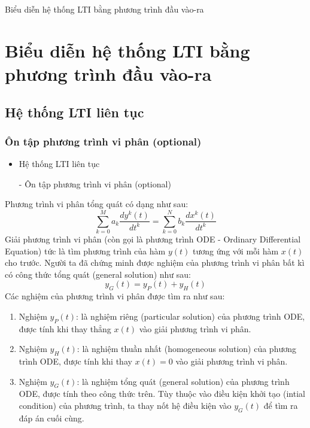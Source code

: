 \documentclass[8pt]{beamer}
\begin{document}
\begin{frame}{Biểu diễn hệ thống LTI bằng phương trình đầu vào-ra}
\section{Biểu diễn hệ thống LTI bằng phương trình đầu vào-ra}
\subsection{Hệ thống LTI liên tục}
\subsubsection{Ôn tập phương trình vi phân (optional)}
\begin{itemize}
	\item Hệ thống LTI liên tục
	\end{itemize}
\begin{itemize}
\item[-] Ôn tập phương trình vi phân (optional)
\end{itemize}
Phương trình vi phân tổng quát có dạng như sau:
$$\sum_{k=0}^{M}a_{k}\frac{dy^k(t)}{dt^k}=\sum_{k=0}^{N}b_{k}\frac{dx^k(t)}{dt^k}$$
Giải phương trình vi phân (còn gọi là phương trình ODE - Ordinary Differential Equation) tức là tìm phương trình của hàm $y(t)$ tương ứng với mỗi hàm $x(t)$ cho trước. Người ta đã chứng minh được nghiệm của phương trình vi phân bất kì có công thức tổng quát (general solution) như sau:
$$y_{G}(t)=y_{P}(t)+y_{H}(t)$$
Các nghiệm của phương trình vi phân được tìm ra như sau:
\begin{enumerate}
	\item Nghiệm $y_{P}(t)$: là nghiệm riêng (particular solution) của phương trình ODE, được tính khi thay thẳng $x(t)$ vào giải phương trình vi phân.
	\item Nghiệm $y_{H}(t)$: là nghiệm thuần nhất (homogeneous solution) của phương trình ODE, được tính khi thay \alert{$x(t)=0$} vào giải phương trình vi phân.
	\item Nghiệm $y_{G}(t)$: là nghiệm tổng quát (general solution) của phương trình ODE, được tính theo công thức trên. Tùy thuộc vào điều kiện khởi tạo (intial condition) của phương trình, ta thay nốt hệ điều kiện vào $y_{G}(t)$ để tìm ra đáp án cuối cùng.
\end{enumerate}
\end{frame}
\end{document}
